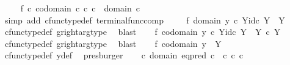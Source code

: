 \begin{isabellebody}
\ \ \ \isamarkupfalse%
\ f{}{\isacharcolon}{\kern0pt}\ {\isachardoublequoteopen}{\isasymforall}c{\isachardot}{\kern0pt}\ {\isasymbeta}\isactrlbsub codomain\ c\isactrlesub \ {\isasymcirc}\isactrlsub c\ c\ {\isacharequal}{\kern0pt}\ {\isasymbeta}\isactrlbsub domain\ c\isactrlesub {\isachardoublequoteclose}\isanewline
\ \ \ \ \isamarkupfalse%
\ {\isacharparenleft}{\kern0pt}simp\ add{\isacharcolon}{\kern0pt}\ cfunc{\isacharunderscore}{\kern0pt}type{\isacharunderscore}{\kern0pt}def\ terminal{\isacharunderscore}{\kern0pt}func{\isacharunderscore}{\kern0pt}comp{\isacharparenright}{\kern0pt}\isanewline
\ \ \ \isamarkupfalse%
\ f{}{\isacharcolon}{\kern0pt}\ {\isachardoublequoteopen}domain\ {\isasymlangle}y{}\ {\isasymcirc}\isactrlsub c\ {\isasymbeta}\isactrlbsub Y\isactrlesub {\isacharcomma}{\kern0pt}id\isactrlsub c\ Y{\isasymrangle}\ {\isacharequal}{\kern0pt}\ Y{\isachardoublequoteclose}\isanewline
\ \ \ \ \isamarkupfalse%
\ cfunc{\isacharunderscore}{\kern0pt}type{\isacharunderscore}{\kern0pt}def\ g{\isacharunderscore}{\kern0pt}right{\isacharunderscore}{\kern0pt}arg{\isacharunderscore}{\kern0pt}type\ \isamarkupfalse%
\ blast\isanewline
\ \ \isamarkupfalse%
\ f{}{\isacharcolon}{\kern0pt}\ {\isachardoublequoteopen}codomain\ {\isasymlangle}y{}\ {\isasymcirc}\isactrlsub c\ {\isasymbeta}\isactrlbsub Y\isactrlesub {\isacharcomma}{\kern0pt}id\isactrlsub c\ Y{\isasymrangle}\ {\isacharequal}{\kern0pt}\ Y\ {\isasymtimes}\isactrlsub c\ Y{\isachardoublequoteclose}\isanewline
\ \ \ \ \isamarkupfalse%
\ cfunc{\isacharunderscore}{\kern0pt}type{\isacharunderscore}{\kern0pt}def\ g{\isacharunderscore}{\kern0pt}right{\isacharunderscore}{\kern0pt}arg{\isacharunderscore}{\kern0pt}type\ \isamarkupfalse%
\ blast\isanewline
\ \ \isamarkupfalse%
\ f{}{\isacharcolon}{\kern0pt}\ {\isachardoublequoteopen}codomain\ y{}\ {\isacharequal}{\kern0pt}\ Y{\isachardoublequoteclose}\isanewline
\ \ \ \ \isamarkupfalse%
\ cfunc{\isacharunderscore}{\kern0pt}type{\isacharunderscore}{\kern0pt}def\ y{\isacharunderscore}{\kern0pt}def\ \isamarkupfalse%
\ presburger\isanewline
\ \ \isamarkupfalse%
\ {\isachardoublequoteopen}{\isasymforall}c{\isachardot}{\kern0pt}\ domain\ {\isacharparenleft}{\kern0pt}eq{\isacharunderscore}{\kern0pt}pred\ c{\isacharparenright}{\kern0pt}\ {\isacharequal}{\kern0pt}\ c\ {\isasymtimes}\isactrlsub c\ c{\isachardoublequoteclose}\isanewline

\end{isabellebody}

